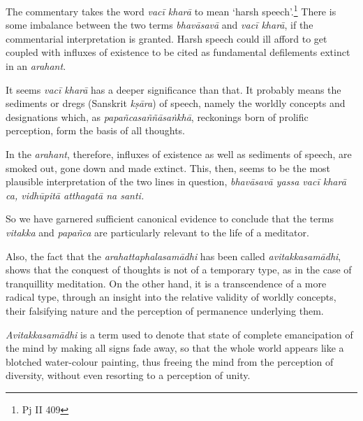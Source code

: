 The commentary takes the word \emph{vacī kharā} to mean `harsh speech'.\footnote{Pj II 409} There is some imbalance between the two terms \emph{bhavāsavā} and \emph{vacī kharā}, if the commentarial interpretation is granted. Harsh speech could ill afford to get coupled with influxes of existence to be cited as fundamental defilements extinct in an \emph{arahant}.

It seems \emph{vacī kharā} has a deeper significance than that. It probably means the sediments or dregs (Sanskrit \emph{kṣāra}) of speech, namely the worldly concepts and designations which, as \emph{papañcasaññāsaṅkhā}, reckonings born of prolific perception, form the basis of all thoughts.

In the \emph{arahant}, therefore, influxes of existence as well as sediments of speech, are smoked out, gone down and made extinct. This, then, seems to be the most plausible interpretation of the two lines in question, \emph{bhavāsavā yassa vacī kharā ca, vidhūpitā atthagatā na santi.}

So we have garnered sufficient canonical evidence to conclude that the terms \emph{vitakka} and \emph{papañca} are particularly relevant to the life of a meditator.

Also, the fact that the \emph{arahattaphalasamādhi} has been called \emph{avitakkasamādhi}, shows that the conquest of thoughts is not of a temporary type, as in the case of tranquillity meditation. On the other hand, it is a transcendence of a more radical type, through an insight into the relative validity of worldly concepts, their falsifying nature and the perception of permanence underlying them.

\enlargethispage{\baselineskip}

\emph{Avitakkasamādhi} is a term used to denote that state of complete emancipation of the mind by making all signs fade away, so that the whole world appears like a blotched water-colour painting, thus freeing the mind from the perception of diversity, without even resorting to a perception of unity.
